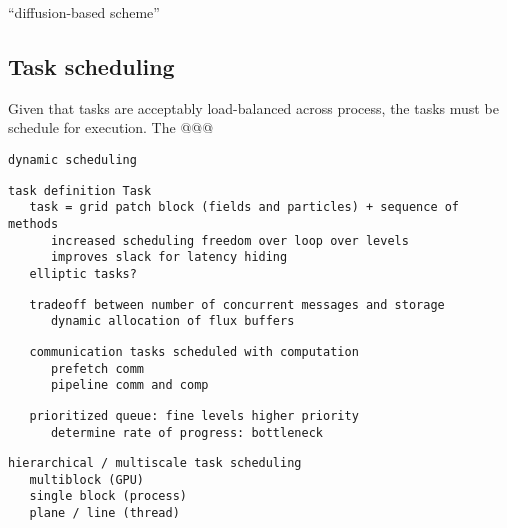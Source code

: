 \documentclass[10pt]{article}
\begin{document}
``diffusion-based scheme''

% 



\subsection{Task scheduling} \label{ss:design-schedule}

Given that tasks are acceptably load-balanced across process, the
tasks must be schedule for execution.  The @@@

\begin{verbatim}
dynamic scheduling
\end{verbatim}

\begin{verbatim}
task definition Task
   task = grid patch block (fields and particles) + sequence of methods
      increased scheduling freedom over loop over levels
      improves slack for latency hiding
   elliptic tasks?
\end{verbatim}

\begin{verbatim}
   tradeoff between number of concurrent messages and storage
      dynamic allocation of flux buffers
\end{verbatim}

\begin{verbatim}
   communication tasks scheduled with computation
      prefetch comm
      pipeline comm and comp
\end{verbatim}

\begin{verbatim}
   prioritized queue: fine levels higher priority
      determine rate of progress: bottleneck
\end{verbatim}

\begin{verbatim}
hierarchical / multiscale task scheduling
   multiblock (GPU)
   single block (process)
   plane / line (thread)
\end{verbatim}
\end{document}
